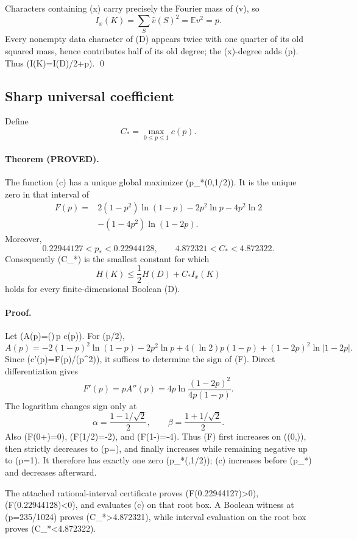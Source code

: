 Characters containing (x) carry precisely the Fourier mass of (v), so
\[
 I_x(K)=\sum_S\widehat v(S)^2=\mathbb E v^2=p.
\]
Every nonempty data character of (D) appears twice with one quarter of its
old squared mass, hence contributes half of its old degree; the (x)-degree
adds (p).  Thus (I(K)=I(D)/2+p). \qed

\subsection*{Sharp universal coefficient}

Define
\[
 C_*=\max_{0\leq p\leq1}c(p).
\]

\paragraph{Theorem (PROVED).}
The function (c) has a unique global maximizer (p_*\in(0,1/2)).  It is
the unique zero in that interval of
\begin{align*}
 F(p)={}&2(1-p^2)\ln(1-p)-2p^2\ln p-4p^2\ln2\\
 &-(1-4p^2)\ln(1-2p).
\end{align*}
Moreover,
\[
 0.22944127<p_*<0.22944128,
 \qquad
 4.872321<C_*<4.872322.
\]
Consequently (C_*) is the smallest constant for which
\[
 H(K)\leq\frac12H(D)+C_* I_x(K)
\]
holds for every finite-dimensional Boolean (D).

\paragraph{Proof.}
Let (A(p)=()\,p c(p)).  For (p/2),
\[
 A(p)=-2(1-p)^2\ln(1-p)-2p^2\ln p
 +4(\ln2)p(1-p)+(1-2p)^2\ln|1-2p|.
\]
Since (c'(p)=F(p)/(p^2)), it suffices to determine the sign of
(F).  Direct differentiation gives
\[
 F'(p)=pA''(p)
 =4p\ln\frac{(1-2p)^2}{4p(1-p)}.
\]
The logarithm changes sign only at
\[
 \alpha=\frac{1-1/\sqrt2}{2},\qquad
 \beta=\frac{1+1/\sqrt2}{2}.
\]
Also (F(0+)=0), (F(1/2)=-2), and (F(1-)=-4).
Thus (F) first increases on ((0,\alpha)), then strictly decreases to
(p=\beta), and finally increases while remaining negative up to (p=1).
It therefore has exactly one zero (p_*\in(\alpha,1/2)); (c) increases
before (p_*) and decreases afterward.

The attached rational-interval certificate proves
(F(0.22944127)>0), (F(0.22944128)<0), and evaluates (c) on that
root box.  A Boolean witness at (p=235/1024) proves
(C_*>4.872321), while interval evaluation on the root box proves
(C_*<4.872322).

